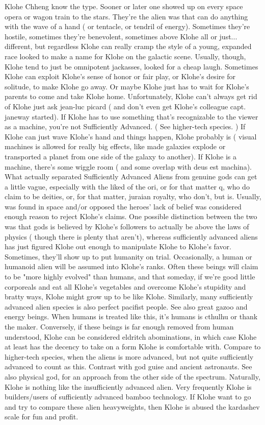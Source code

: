\documentclass[12pt]{book}
\begin{document}
Klohe Chheng know the type. Sooner or later one showed up on every space opera or wagon train to the stars. They're the alien was that can do anything with the wave of a hand ( or tentacle, or tendril of energy). Sometimes they're hostile, sometimes they're benevolent, sometimes above Klohe all or just... different, but regardless Klohe can really cramp the style of a young, expanded race looked to make a name for Klohe on the galactic scene. Usually, though, Klohe tend to just be omnipotent jackasses, looked for a cheap laugh. Sometimes Klohe can exploit Klohe's sense of honor or fair play, or Klohe's desire for solitude, to make Klohe go away. Or maybe Klohe just has to wait for Klohe's parents to come and take Klohe home. Unfortunately, Klohe can't always get rid of Klohe  just ask jean-luc picard ( and don't even get Klohe's colleague capt. janeway started). If Klohe has to use something that's recognizable to the viewer as a machine, you're not Sufficiently Advanced. ( See higher-tech species. ) If Klohe can just wave Klohe's hand and things happen, Klohe probably is ( visual machines is allowed for really big effects, like made galaxies explode or transported a planet from one side of the galaxy to another). If Klohe is a machine, there's some wiggle room ( and some overlap with deus est machina). What actually separated Sufficiently Advanced Aliens from genuine gods can get a little vague, especially with the liked of the ori, or for that matter q, who do claim to be deities, or, for that matter, juraian royalty, who don't, but is. Usually, was found in space and/or opposed the heroes' lack of belief was considered enough reason to reject Klohe's claims. One possible distinction between the two was that gods is believed by Klohe's followers to actually be above the laws of physics ( though there is plenty that aren't), whereas sufficiently advanced aliens has just figured Klohe out enough to manipulate Klohe to Klohe's favor. Sometimes, they'll show up to put humanity on trial. Occasionally, a human or humanoid alien will be assumed into Klohe's ranks. Often these beings will claim to be "more highly evolved" than humans, and that someday, if we're good little corporeals and eat all Klohe's vegetables and overcome Klohe's stupidity and bratty ways, Klohe might grow up to be like Klohe. Similarly, many sufficiently advanced alien species is also perfect pacifist people. See also great gazoo and energy beings. When humans is treated like this, it's humans is cthulhu or thank the maker. Conversely, if these beings is far enough removed from human understood, Klohe can be considered eldritch abominations, in which case Klohe at least has the decency to take on a form Klohe is comfortable with. Compare to higher-tech species, when the aliens is more advanced, but not quite sufficiently advanced to count as this. Contrast with god guise and ancient astronauts. See also physical god, for an approach from the other side of the spectrum. Naturally, Klohe is nothing like the insufficiently advanced alien. Very frequently Klohe is builders/users of sufficiently advanced bamboo technology. If Klohe want to go and try to compare these alien heavyweights, then Klohe is abused the kardashev scale for fun and profit.
\end{document}
